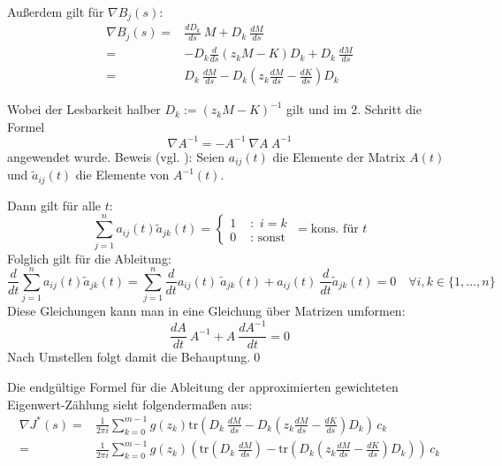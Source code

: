 \documentclass[a4paper,12pt]{report}
\newcommand{\klammer}[1]{\left(#1\right)}
\newcommand{\tr}{\text{tr}}
\newcommand{\inv}{^{-1}}
\newcommand{\1}{\mathds{1}}
\theoremstyle{plain} %
\theoremstyle{definition} %
\theoremstyle{remark}
\begin{document}
            Außerdem gilt für $\nabla B_j(s)$:
            \begin{align*}
                  \nabla B_j(s) =& \frac{dD_k}{ds} \ M + D_k \ \frac{dM}{ds}\\
                  =& - D_k \frac{d}{ds}(z_kM-K) D_k + D_k \ \frac{dM}{ds}\\
                  =& D_k \ \frac{dM}{ds} - D_k \klammer{z_k \frac{dM}{ds}-\frac{dK}{ds}} D_k
            \end{align*}

            Wobei der Lesbarkeit halber $D_k:=(z_kM-K)\inv$ gilt und im 2. Schritt die Formel
            $$\nabla A\inv = -A\inv\ \nabla A\ A\inv$$
            angewendet wurde.
            Beweis (vgl. \cite{derivativeInverseMatrix}):
            Seien $a_{ij}(t)$ die Elemente der Matrix $A(t)$ und $\widetilde{a}_{ij}(t)$ die Elemente von $A\inv(t)$.

            Dann gilt für alle $t$:
            $$\sum_{j=1}^{n} a_{ij}(t)\widetilde{a}_{jk}(t) =  \begin{cases}
                        1 & \text{ :  }\, i=k \\
                        0 & \text{ :  sonst } 
                        \end{cases} = \text{kons. für }t $$
            Folglich gilt für die Ableitung:
            $$\frac{d}{dt}\sum_{j=1}^{n} a_{ij}(t)\widetilde{a}_{jk}(t) = \sum_{j=1}^{n} \frac{d}{dt}a_{ij}(t)\ \widetilde{a}_{jk}(t)+a_{ij}(t)\ \frac{d}{dt}\widetilde{a}_{jk}(t) = 0 \quad \forall i,k\in\{1,\dots,n\}$$
            Diese Gleichungen kann man in eine Gleichung über Matrizen umformen:
            $$\frac{dA}{dt}\ A\inv + A\ \frac{dA\inv}{dt} = 0$$
            Nach Umstellen folgt damit die Behauptung.\qed

            Die endgültige Formel für die Ableitung der approximierten gewichteten Eigenwert-Zählung sieht folgendermaßen aus:
            \begin{align}
                  \label{eqn: vollständigeZielfunktion}
                  \nabla J^*(s) =& \frac 1 {2\pi i}\sum_{k=0}^{m-1} g(z_k) \tr\klammer{D_k \ \frac{dM}{ds} - D_k \klammer{z_k \frac{dM}{ds}-\frac{dK}{ds}} D_k}\,c_k\\
                  =& \frac 1 {2\pi i}\sum_{k=0}^{m-1} g(z_k) \klammer{\tr\klammer{D_k \ \frac{dM}{ds}} - \tr\klammer{D_k \klammer{z_k \frac{dM}{ds}-\frac{dK}{ds}} D_k}}\,c_k
            \end{align}
            
\end{document}
